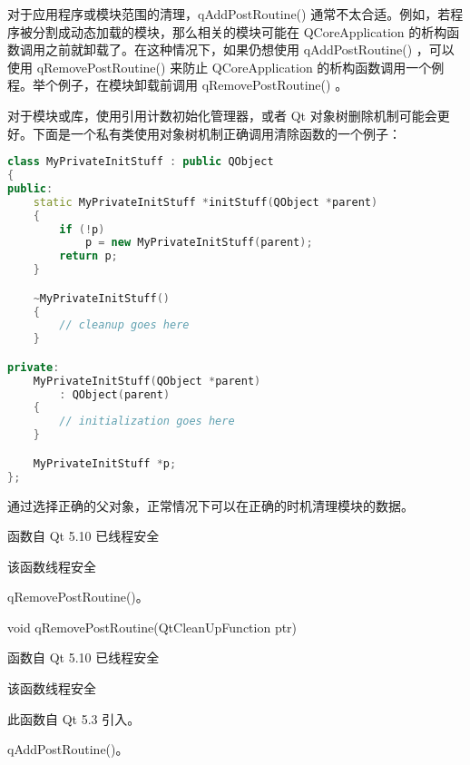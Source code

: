 \begin{notice}
对于应用程序或模块范围的清理，qAddPostRoutine() 通常不太合适。例如，若程序被分割成动态加载的模块，那么相关的模块可能在 QCoreApplication 的析构函数调用之前就卸载了。在这种情况下，如果仍想使用 qAddPostRoutine() ，可以使用 qRemovePostRoutine() 来防止 QCoreApplication 的析构函数调用一个例程。举个例子，在模块卸载前调用 qRemovePostRoutine() 。
\end{notice}

对于模块或库，使用引用计数初始化管理器，或者 Qt 对象树删除机制可能会更
好。下面是一个私有类使用对象树机制正确调用清除函数的一个例子：

\begin{lstlisting}[language=C++]
class MyPrivateInitStuff : public QObject
{
public:
    static MyPrivateInitStuff *initStuff(QObject *parent)
    {
        if (!p)
            p = new MyPrivateInitStuff(parent);
        return p;
    }

    ~MyPrivateInitStuff()
    {
        // cleanup goes here
    }

private:
    MyPrivateInitStuff(QObject *parent)
        : QObject(parent)
    {
        // initialization goes here
    }

    MyPrivateInitStuff *p;
};
\end{lstlisting}

通过选择正确的父对象，正常情况下可以在正确的时机清理模块的数据。

\begin{notice}
 函数自 Qt 5.10 已线程安全
\end{notice}

\begin{notice}
该函数线程安全
\end{notice}

\begin{seeAlso}
qRemovePostRoutine()。
\end{seeAlso}


void qRemovePostRoutine(QtCleanUpFunction ptr)

\begin{notice}
函数自 Qt 5.10 已线程安全
\end{notice}

 

\begin{notice}
该函数线程安全
\end{notice}


此函数自 Qt 5.3 引入。



\begin{seeAlso}
qAddPostRoutine()。
\end{seeAlso}

